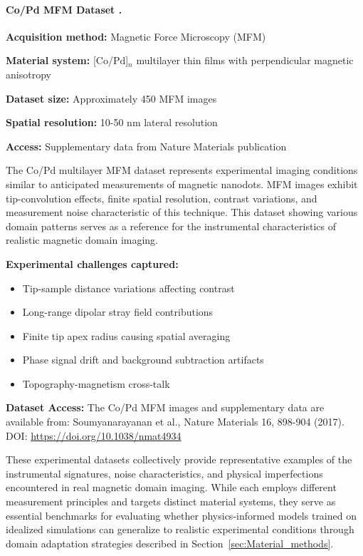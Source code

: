 \documentclass[letterpaper, 12, one column]{article}
\begin{document}
\paragraph{Co/Pd MFM Dataset .}

\textbf{Acquisition method:} Magnetic Force Microscopy (MFM)

\textbf{Material system:} [Co/Pd]$_n$ multilayer thin films with perpendicular magnetic anisotropy

\textbf{Dataset size:} Approximately 450 MFM images

\textbf{Spatial resolution:} 10-50 nm lateral resolution

\textbf{Access:} Supplementary data from Nature Materials publication

The Co/Pd multilayer MFM dataset represents experimental imaging conditions similar to anticipated measurements of magnetic nanodots. MFM images exhibit tip-convolution effects, finite spatial resolution, contrast variations, and measurement noise characteristic of this technique. This dataset showing various domain patterns serves as a reference for the instrumental characteristics of realistic magnetic domain imaging.

\textbf{Experimental challenges captured:}
\begin{itemize}
    \item Tip-sample distance variations affecting contrast
    \item Long-range dipolar stray field contributions
    \item Finite tip apex radius causing spatial averaging
    \item Phase signal drift and background subtraction artifacts
    \item Topography-magnetism cross-talk
\end{itemize}

\vspace{0.3cm}
\noindent\textbf{Dataset Access:} The Co/Pd MFM images and supplementary data are available from: Soumyanarayanan et al., Nature Materials 16, 898-904 (2017). DOI: \url{https://doi.org/10.1038/nmat4934}
\vspace{0.3cm}

\vspace{0.5cm}

These experimental datasets collectively provide representative examples of the instrumental signatures, noise characteristics, and physical imperfections encountered in real magnetic domain imaging. While each employs different measurement principles and targets distinct material systems, they serve as essential benchmarks for evaluating whether physics-informed models trained on idealized simulations can generalize to realistic experimental conditions through domain adaptation strategies described in Section~\ref{sec:Material_methods}.
\end{document}
